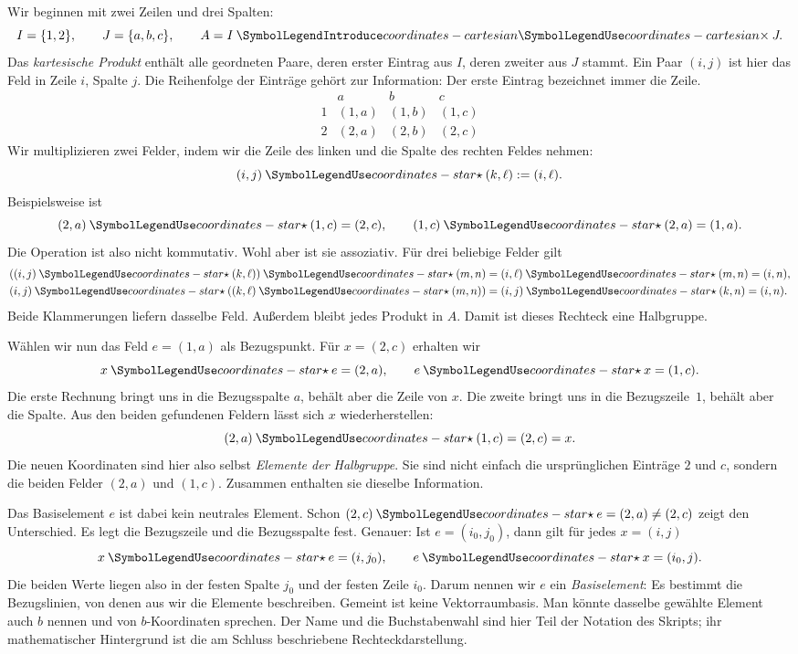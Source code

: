 Wir beginnen mit zwei Zeilen und drei Spalten:
\[
  I=\{1,2\},\qquad J=\{a,b,c\},\qquad
  A=I\CRBin*{coordinates-cartesian}{\times}J.
\]
Das \emph{kartesische Produkt} enthält alle geordneten Paare, deren
erster Eintrag aus \(I\), deren zweiter aus \(J\) stammt.
Ein Paar \((i,j)\) ist hier das Feld in Zeile \(i\), Spalte \(j\).
Die Reihenfolge der Einträge gehört zur Information: Der erste
Eintrag bezeichnet immer die Zeile.
\[
  \begin{array}{c|ccc}
    &a&b&c\\\hline
    1&(1,a)&(1,b)&(1,c)\\
    2&(2,a)&(2,b)&(2,c)
  \end{array}
\]
Wir multiplizieren zwei Felder, indem wir die Zeile des linken und
die Spalte des rechten Feldes nehmen:
\[
  (i,j)\CRStar(k,\ell):=(i,\ell).
\]
Beispielsweise ist
\[
  (2,a)\CRStar(1,c)=(2,c),\qquad
  (1,c)\CRStar(2,a)=(1,a).
\]
Die Operation ist also nicht kommutativ. Wohl aber ist sie
assoziativ. Für drei beliebige Felder gilt
\[
 \begin{aligned}
  ((i,j)\CRStar(k,\ell))\CRStar(m,n)&=(i,\ell)\CRStar(m,n)=(i,n),\\
  (i,j)\CRStar((k,\ell)\CRStar(m,n))&=(i,j)\CRStar(k,n)=(i,n).
 \end{aligned}
\]
Beide Klammerungen liefern dasselbe Feld. Außerdem bleibt jedes
Produkt in \(A\). Damit ist dieses Rechteck eine Halbgruppe.

Wählen wir nun das Feld \(e=(1,a)\) als Bezugspunkt. Für
\(x=(2,c)\) erhalten wir
\[
  x\CRStar e=(2,a),\qquad e\CRStar x=(1,c).
\]
Die erste Rechnung bringt uns in die Bezugsspalte \(a\), behält aber
die Zeile von \(x\). Die zweite bringt uns in die Bezugszeile~\(1\),
behält aber die Spalte. Aus den beiden gefundenen Feldern lässt
sich \(x\) wiederherstellen:
\[
  (2,a)\CRStar(1,c)=(2,c)=x.
\]
Die neuen Koordinaten sind hier also selbst \emph{Elemente der
Halbgruppe}. Sie sind nicht einfach die ursprünglichen Einträge
\(2\) und \(c\), sondern die beiden Felder \((2,a)\) und
\((1,c)\). Zusammen enthalten sie dieselbe Information.

Das Basiselement \(e\) ist dabei kein neutrales Element. Schon
\((2,c)\CRStar e=(2,a)\ne(2,c)\) zeigt den Unterschied.
Es legt die Bezugszeile und die Bezugsspalte fest. Genauer: Ist
\(e=(i_0,j_0)\), dann gilt für jedes \(x=(i,j)\)
\[
  x\CRStar e=(i,j_0),\qquad e\CRStar x=(i_0,j).
\]
Die beiden Werte liegen also in der festen Spalte \(j_0\) und
der festen Zeile \(i_0\). Darum nennen wir \(e\) ein
\emph{Basiselement}: Es bestimmt die Bezugslinien, von denen aus
wir die Elemente beschreiben. Gemeint ist keine Vektorraumbasis.
Man könnte dasselbe gewählte Element auch \(b\) nennen und von
\(b\)-Koordinaten sprechen. Der Name und die Buchstabenwahl sind
hier Teil der Notation des Skripts; ihr mathematischer Hintergrund
ist die am Schluss beschriebene Rechteckdarstellung.

